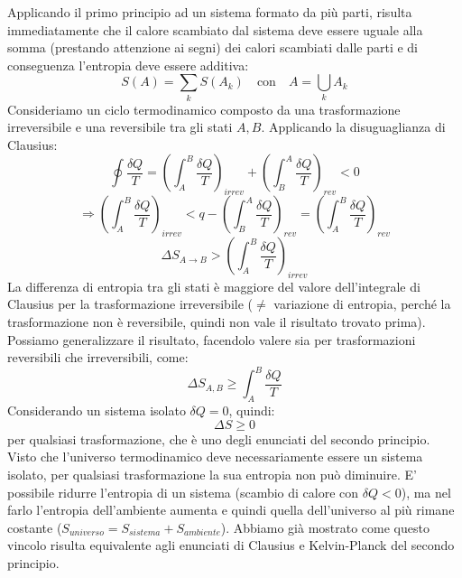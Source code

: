 \documentclass{article}
\begin{document}
Applicando il primo principio ad un sistema formato da più parti, risulta immediatamente che il calore scambiato dal sistema deve essere uguale alla somma (prestando attenzione ai segni) dei calori scambiati dalle parti e di conseguenza l'entropia deve essere additiva:
$$ S(A) = \sum_kS(A_k) \quad\text{con}\quad A=\bigcup_k A_k $$
Consideriamo un ciclo termodinamico composto da una trasformazione irreversibile e una reversibile tra gli stati $A,B$. Applicando la disuguaglianza di Clausius:
$$ \oint\frac{\delta Q}{T}=\left(\int_{A}^{B}\frac{\delta Q}{T}\right)_{irrev}+\left(\int_{B}^{A}\frac{\delta Q}{T}\right)_{rev} < 0$$
$$ \Rightarrow \left(\int_{A}^{B}\frac{\delta Q}{T}\right)_{irrev} < q -\left(\int_{B}^{A}\frac{\delta Q}{T}\right)_{rev}=\left(\int_{A}^{B}\frac{\delta Q}{T}\right)_{rev} $$
$$ \Delta S_{A\rightarrow B} > \left(\int_{A}^{B}\frac{\delta Q}{T}\right)_{irrev} $$
La differenza di entropia tra gli stati è maggiore del valore dell'integrale di Clausius per la trasformazione irreversibile ($\neq$ variazione di entropia, perché la trasformazione non è reversibile, quindi non vale il risultato trovato prima). Possiamo generalizzare il risultato, facendolo valere sia per trasformazioni reversibili che irreversibili, come:
$$ \Delta S_{A,B} \geq \int_{A}^{B}\frac{\delta Q}{T} $$
Considerando un sistema isolato $\delta Q=0$, quindi:
$$ \Delta S\geq 0 $$
per qualsiasi trasformazione, che è uno degli enunciati del secondo principio. Visto che l'universo termodinamico deve necessariamente essere un sistema isolato, per qualsiasi trasformazione la sua entropia non può diminuire. E' possibile ridurre l'entropia di un sistema (scambio di calore con $\delta Q<0$), ma nel farlo l'entropia dell'ambiente aumenta e quindi quella dell'universo al più rimane costante ($S_{universo}=S_{sistema}+S_{ambiente}$). Abbiamo già mostrato come questo vincolo risulta equivalente agli enunciati di Clausius e Kelvin-Planck del secondo principio.
\end{document}

